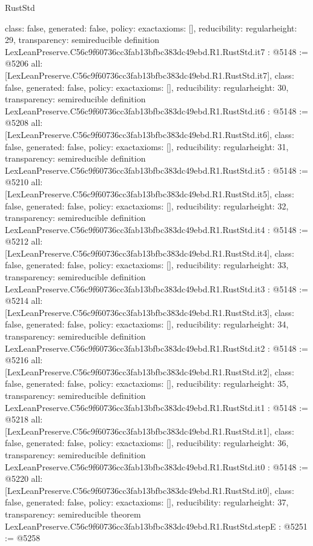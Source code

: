 \begin{lexlean}{RustStd}
\begin{coremodule}
{  class: false,
  generated: false,
  policy: exact{axioms: []},
  reducibility: regular{height: 29},
  transparency: semireducible
}
definition LexLeanPreserve.C56c9f60736cc3fab13bfbc383dc49ebd.R1.RustStd.it7 : @5148 := @5206 {
  all: [LexLeanPreserve.C56c9f60736cc3fab13bfbc383dc49ebd.R1.RustStd.it7],
  class: false,
  generated: false,
  policy: exact{axioms: []},
  reducibility: regular{height: 30},
  transparency: semireducible
}
definition LexLeanPreserve.C56c9f60736cc3fab13bfbc383dc49ebd.R1.RustStd.it6 : @5148 := @5208 {
  all: [LexLeanPreserve.C56c9f60736cc3fab13bfbc383dc49ebd.R1.RustStd.it6],
  class: false,
  generated: false,
  policy: exact{axioms: []},
  reducibility: regular{height: 31},
  transparency: semireducible
}
definition LexLeanPreserve.C56c9f60736cc3fab13bfbc383dc49ebd.R1.RustStd.it5 : @5148 := @5210 {
  all: [LexLeanPreserve.C56c9f60736cc3fab13bfbc383dc49ebd.R1.RustStd.it5],
  class: false,
  generated: false,
  policy: exact{axioms: []},
  reducibility: regular{height: 32},
  transparency: semireducible
}
definition LexLeanPreserve.C56c9f60736cc3fab13bfbc383dc49ebd.R1.RustStd.it4 : @5148 := @5212 {
  all: [LexLeanPreserve.C56c9f60736cc3fab13bfbc383dc49ebd.R1.RustStd.it4],
  class: false,
  generated: false,
  policy: exact{axioms: []},
  reducibility: regular{height: 33},
  transparency: semireducible
}
definition LexLeanPreserve.C56c9f60736cc3fab13bfbc383dc49ebd.R1.RustStd.it3 : @5148 := @5214 {
  all: [LexLeanPreserve.C56c9f60736cc3fab13bfbc383dc49ebd.R1.RustStd.it3],
  class: false,
  generated: false,
  policy: exact{axioms: []},
  reducibility: regular{height: 34},
  transparency: semireducible
}
definition LexLeanPreserve.C56c9f60736cc3fab13bfbc383dc49ebd.R1.RustStd.it2 : @5148 := @5216 {
  all: [LexLeanPreserve.C56c9f60736cc3fab13bfbc383dc49ebd.R1.RustStd.it2],
  class: false,
  generated: false,
  policy: exact{axioms: []},
  reducibility: regular{height: 35},
  transparency: semireducible
}
definition LexLeanPreserve.C56c9f60736cc3fab13bfbc383dc49ebd.R1.RustStd.it1 : @5148 := @5218 {
  all: [LexLeanPreserve.C56c9f60736cc3fab13bfbc383dc49ebd.R1.RustStd.it1],
  class: false,
  generated: false,
  policy: exact{axioms: []},
  reducibility: regular{height: 36},
  transparency: semireducible
}
definition LexLeanPreserve.C56c9f60736cc3fab13bfbc383dc49ebd.R1.RustStd.it0 : @5148 := @5220 {
  all: [LexLeanPreserve.C56c9f60736cc3fab13bfbc383dc49ebd.R1.RustStd.it0],
  class: false,
  generated: false,
  policy: exact{axioms: []},
  reducibility: regular{height: 37},
  transparency: semireducible
}
theorem LexLeanPreserve.C56c9f60736cc3fab13bfbc383dc49ebd.R1.RustStd.stepE : @5251 := @5258 {
}
\end{coremodule}
\end{lexlean}
